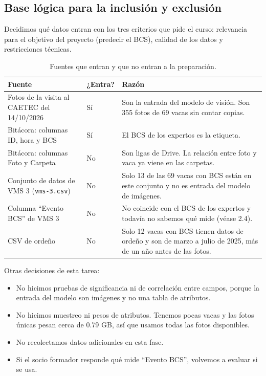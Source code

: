 \subsection{Base lógica para la inclusión y exclusión}

Decidimos qué datos entran con los tres criterios que pide el curso: relevancia para el objetivo del proyecto (predecir el BCS), calidad de los datos y restricciones técnicas.

\begin{table}[H]
  \centering
  \small
  \caption{Fuentes que entran y que no entran a la preparación.}
  \label{tab:seleccion}
  \begin{tabularx}{\textwidth}{>{\raggedright\arraybackslash}p{}l>{\raggedright\arraybackslash}X}
    \toprule
    Fuente & ¿Entra? & Razón \\
    \midrule
    Fotos de la visita al CAETEC del 14/10/2026 & Sí & Son la entrada del modelo de visión. Son 355 fotos de 69 vacas sin contar copias. \\
    \addlinespace
    Bitácora: columnas ID, hora y BCS & Sí & El BCS de los expertos es la etiqueta. \\
    \addlinespace
    Bitácora: columnas Foto y Carpeta & No & Son ligas de Drive. La relación entre foto y vaca ya viene en las carpetas. \\
    \addlinespace
    Conjunto de datos de VMS 3 (\nolinkurl{vms-3.csv}) & No & Solo 13 de las 69 vacas con BCS están en este conjunto y no es entrada del modelo de imágenes. \\
    \addlinespace
    Columna ``Evento BCS'' de VMS 3 & No & No coincide con el BCS de los expertos y todavía no sabemos qué mide (véase 2.4). \\
    \addlinespace
    CSV de ordeño & No & Solo 12 vacas con BCS tienen datos de ordeño y son de marzo a julio de 2025, más de un año antes de las fotos. \\
    \bottomrule
  \end{tabularx}
\end{table}

Otras decisiones de esta tarea:

\begin{itemize}
  \item No hicimos pruebas de significancia ni de correlación entre campos, porque la entrada del modelo son imágenes y no una tabla de atributos.
  \item No hicimos muestreo ni pesos de atributos. Tenemos pocas vacas y las fotos únicas pesan cerca de 0.79 GB, así que usamos todas las fotos disponibles.
  \item No recolectamos datos adicionales en esta fase.
  \item Si el socio formador responde qué mide ``Evento BCS'', volvemos a evaluar si se usa.
\end{itemize}

